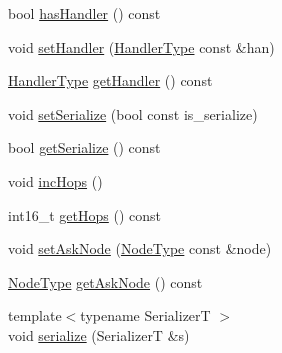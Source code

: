 \begin{DoxyCompactItemize}
\item 
bool \hyperlink{structvt_1_1location_1_1_entity_msg_a0796bd63248dae2b457aa2eedc345743}{has\+Handler} () const
\item 
void \hyperlink{structvt_1_1location_1_1_entity_msg_a343ec9990f43b1f2e0bf6b883e7ae507}{set\+Handler} (\hyperlink{namespacevt_af64846b57dfcaf104da3ef6967917573}{Handler\+Type} const \&han)
\item 
\hyperlink{namespacevt_af64846b57dfcaf104da3ef6967917573}{Handler\+Type} \hyperlink{structvt_1_1location_1_1_entity_msg_ab373f1520ac7374900bbea1026372b8e}{get\+Handler} () const
\item 
void \hyperlink{structvt_1_1location_1_1_entity_msg_a3a26a497f5d3107ca513582c842963bd}{set\+Serialize} (bool const is\+\_\+serialize)
\item 
bool \hyperlink{structvt_1_1location_1_1_entity_msg_a0dc24a126251cb00a1e44b19eeb9208e}{get\+Serialize} () const
\item 
void \hyperlink{structvt_1_1location_1_1_entity_msg_a2bd45f682dbeb4f6a39ded357483012b}{inc\+Hops} ()
\item 
int16\+\_\+t \hyperlink{structvt_1_1location_1_1_entity_msg_a42198cb01c34983b7c46103cea721b9f}{get\+Hops} () const
\item 
void \hyperlink{structvt_1_1location_1_1_entity_msg_a42166a96c86f14d91cf378ff2e315db6}{set\+Ask\+Node} (\hyperlink{namespacevt_a866da9d0efc19c0a1ce79e9e492f47e2}{Node\+Type} const \&node)
\item 
\hyperlink{namespacevt_a866da9d0efc19c0a1ce79e9e492f47e2}{Node\+Type} \hyperlink{structvt_1_1location_1_1_entity_msg_a5a95c196dd8c41a15988b90bca30a316}{get\+Ask\+Node} () const
\item 
{\footnotesize template$<$typename SerializerT $>$ }\\void \hyperlink{structvt_1_1location_1_1_entity_msg_a203b07e756313743e7258b8b1dbcb527}{serialize} (SerializerT \&s)
\end{DoxyCompactItemize}
